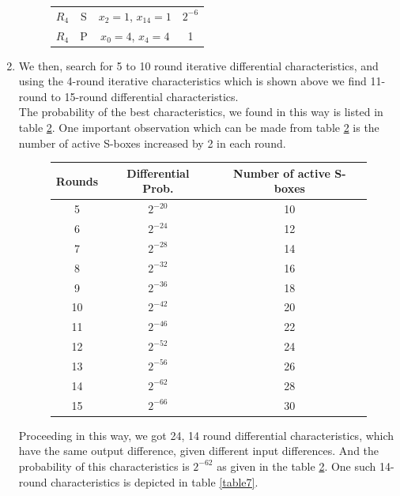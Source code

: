 \documentclass[preprint]{transcrypto}
\begin{document}
\begin{enumerate}
\begin{figure}[h!]
\begin{tabular}{ |c||c|c|c| }
             $R_4$& S & $x_2 = 1$, $x_{14} = 1$  & $2^{-6}$ \\
             $R_4$& P & $x_0 = 4$, $x_4 = 4$ & 1 \\ \hline
        \end{tabular}
        \label{fig7}
    \end{figure}
    \item We then, search for 5 to 10 round iterative differential characteristics, and using the 4-round iterative characteristics which is shown above we find 11-round to 15-round differential characteristics. \\
    The probability of the best characteristics, we found in this way is listed in table \ref{table6}. One important observation which can be made from table \ref{table6} is the number of active S-boxes increased by 2 in each round.
    \begin{figure}[h!]
        \centering
        \begin{tabular}{ |c|c|c| }
            \hline
             Rounds & Differential Prob. & Number of active S-boxes \\ \hline
             5& $2^{-20}$ & 10 \\ 
             6& $2^{-24}$ & 12 \\
             7& $2^{-28}$ & 14 \\
             8& $2^{-32}$ & 16 \\
             9& $2^{-36}$ & 18 \\
             10& $2^{-42}$ & 20 \\
             11& $2^{-46}$ & 22 \\
             12& $2^{-52}$  & 24 \\
             13& $2^{-56}$  & 26 \\
             14& $2^{-62}$  & 28 \\
             15& $2^{-66}$ & 30 \\ \hline
        \end{tabular}
        \label{table6}
    \end{figure}
    Proceeding in this way, we got 24, 14 round differential characteristics, which have the same output difference, given different input differences. And the probability of this characteristics is $2^{-62}$ as given in the table \ref{table6}. One such 14-round characteristics is depicted in table \ref{table7}.
    \begin{figure}[h!]

\end{figure}
\end{enumerate}
\end{document}
